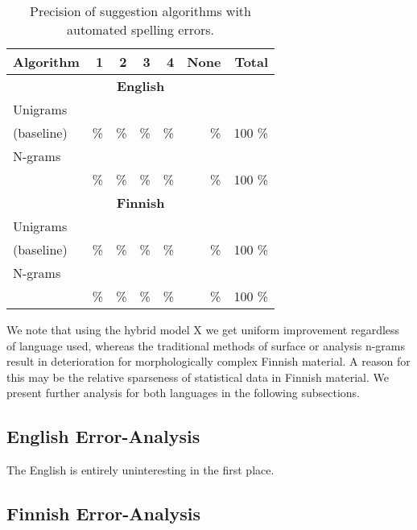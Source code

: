 \documentclass{llncs}
\begin{document}
\begin{table*}
    \caption{Precision of suggestion algorithms with automated spelling errors.
    \label{table:fake-eval}}
  \begin{center}
    \begin{scriptsize}
      \begin{tabular}{lrrrrrr}
        \hline
        Algorithm & 1 & 2 & 3 & 4 & None & Total \\
        \hline
        \multicolumn{7}{c}{\textbf{English}} \\
        \hline
        Unigrams
 &     &       &      &      &        &     \\
        (baseline)
 &  \% &    \% &   \% &   \% &    \%  & 100 \% \\
        \hline
        N-grams
&       &      &      &      &       &     \\
&    \% &   \% &   \% &   \% &    \% & 100 \% \\
        \hline
        \multicolumn{7}{c}{\textbf{Finnish}} \\
        \hline
        Unigrams
   &     &       &      &      &       &     \\
        (baseline)
 &  \% &    \% &   \% &   \% &    \% & 100 \% \\
        \hline
        N-grams 
&       &      &      &      &       &     \\
 &    \% &   \% &   \% &   \% &    \% & 100 \% \\
        \hline
      \end{tabular}
    \end{scriptsize}
  \end{center}
\end{table*}

We note that using the hybrid model X we get uniform improvement regardless
of language used, whereas the traditional methods of surface or analysis n-grams
result in deterioration for morphologically complex Finnish material. A reason
for this may be the relative sparseness of statistical data in Finnish
material. We present further analysis for both languages in the following 
subsections.

\subsection{English Error-Analysis}

The English is entirely uninteresting in the first place.

\subsection{Finnish Error-Analysis}
\end{document}

